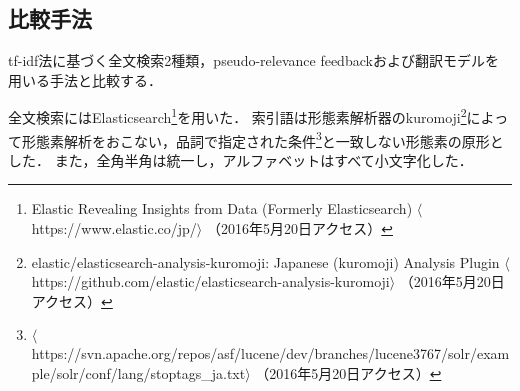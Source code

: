 \documentclass[japanese]{jnlp_1.4}
\begin{document}
\subsection{比較手法}

tf-idf法に基づく全文検索2種類，pseudo-relevance feedbackおよび翻訳モデルを用いる手法と比較する．

全文検索にはElasticsearch\footnote{Elastic Revealing Insights from Data (Formerly Elasticsearch) $\langle$https://www.elastic.co/jp/$\rangle$ （2016年5月20日アクセス）}を用いた．
索引語は形態素解析器のkuromoji\footnote{elastic/elasticsearch-analysis-kuromoji: Japanese (kuromoji) Analysis Plugin $\langle$https://github.com/\linebreak[2]elastic/\linebreak[2]elasticsearch-analysis-kuromoji$\rangle$ （2016年5月20日アクセス）}によって形態素解析をおこない，品詞で指定された条件\footnote{$\langle$https://svn.apache.org/repos/asf/lucene/dev/branches/lucene3767/solr/example/solr/conf/lang/stoptags\_\linebreak[2]ja.txt$\rangle$ （2016年5月20日アクセス）}と一致しない形態素の原形とした．
また，全角半角は統一し，アルファベットはすべて小文字化した．
\end{document}
